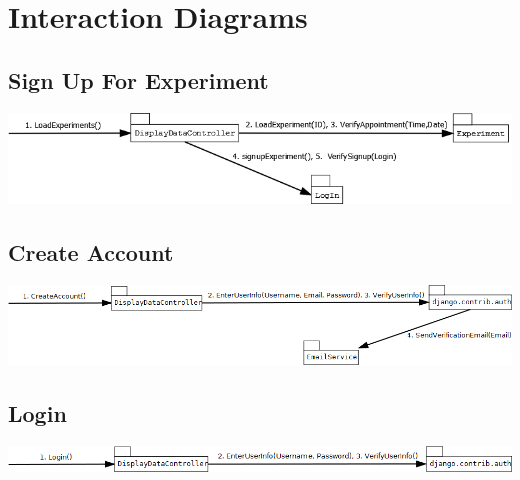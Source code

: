 \section{Interaction Diagrams}
\subsection{Sign Up For Experiment}
\includegraphics[width=6.5in]{../other/interaction_diagrams/browse_signup_experiments.png}
\subsection{Create Account}
\includegraphics[width=6.5in]{../other/interaction_diagrams/create-account.png}
\subsection{Login}
\includegraphics[width=6.5in]{../other/interaction_diagrams/login.png}